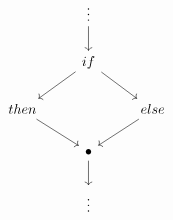 \[\begin{tikzcd}
	& {\vdots } \\
	& if \\
	then && else \\
	& \bullet \\
	& \vdots
	\arrow[from=1-2, to=2-2]
	\arrow[from=2-2, to=3-1]
	\arrow[from=3-1, to=4-2]
	\arrow[from=2-2, to=3-3]
	\arrow[from=3-3, to=4-2]
	\arrow[from=4-2, to=5-2]
\end{tikzcd}\]